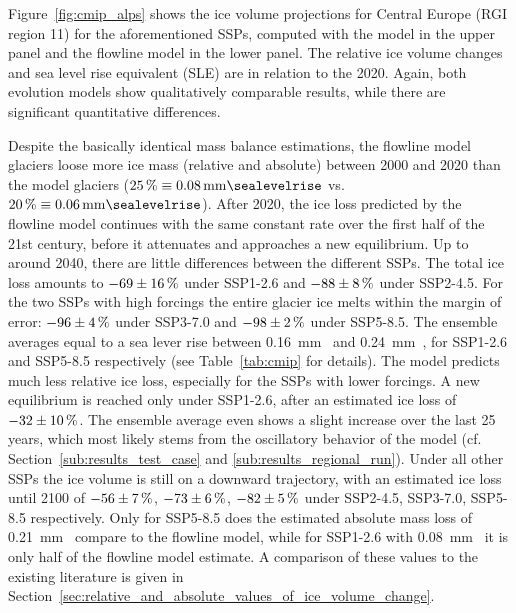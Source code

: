       Figure~\ref{fig:cmip_alps} shows the ice volume projections for Central Europe (RGI region 11) for the aforementioned SSPs, computed with the \vas{} model in the upper panel and the flowline model in the lower panel. The relative ice volume changes and sea level rise equivalent (SLE) are in relation to the 2020. Again, both evolution models show qualitatively comparable results, while there are significant quantitative differences.

      Despite the basically identical mass balance estimations, the flowline model glaciers loose more ice mass (relative and absolute) between 2000 and 2020 than the \vas{} model glaciers ($\SI{25}{\percent} \equiv \SI{0.08}{\milli\meter\sealevelrise}$ vs. $\SI{20}{\percent} \equiv \SI{0.06}{\milli\meter\sealevelrise}$). After 2020, the ice loss predicted by the flowline model continues with the same constant rate over the first half of the 21st century, before it attenuates and approaches a new equilibrium. Up to around 2040, there are little differences between the different SSPs. The total ice loss amounts to $-69\SI{\pm16}{\percent} $ under SSP1-2.6 and $-88\SI{\pm8}{\percent}$  under SSP2-4.5. For the two SSPs with high forcings the entire glacier ice melts within the margin of error: $-96\SI{\pm4}{\percent}$ under SSP3-7.0 and $-98\SI{\pm2}{\percent}$ under SSP5-8.5. The ensemble averages equal to a sea lever rise between \SI{0.16}{\milli\meter\sealevelrise} and \SI{0.24}{\milli\meter\sealevelrise}, for SSP1-2.6 and SSP5-8.5 respectively (see Table~\ref{tab:cmip} for details). The \vas{} model predicts much less relative ice loss, especially for the SSPs with lower forcings. A new equilibrium is reached only under SSP1-2.6, after an estimated ice loss of $-32\SI{\pm10}{\percent}$. The ensemble average even shows a slight increase over the last 25 years, which most likely stems from the oscillatory behavior of the \vas{} model (cf. Section~\ref{sub:results_test_case} and \ref{sub:results_regional_run}). Under all other SSPs the ice volume is still on a downward trajectory, with an estimated ice loss until 2100 of $-56\SI{\pm7}{\percent}$, $-73\SI{\pm6}{\percent}$, $-82\SI{\pm5}{\percent}$ under SSP2-4.5, SSP3-7.0, SSP5-8.5 respectively. Only for SSP5-8.5 does the estimated absolute mass loss of \SI{0.21}{\milli\meter\sealevelrise} compare to the flowline model, while for SSP1-2.6 with \SI{0.08}{\milli\meter\sealevelrise} it is only half of the flowline model estimate. A comparison of these values to the existing literature is given in Section~\ref{sec:relative_and_absolute_values_of_ice_volume_change}.

